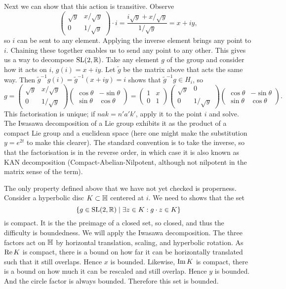 \begin{example}
Next we can show that this action is transitive.
Observe
\[
\begin{pmatrix}
\sqrt{y} & x/\sqrt{y} \\ 0 & 1/\sqrt{y}
\end{pmatrix} \cdot i
= \frac{i\sqrt{y} + x/\sqrt{y}}{1/\sqrt{y}}
= x + iy,
\]
so $i$ can be sent to any element.
Applying the inverse element brings any point to $i$.
Chaining these together enables us to send any point to any other.
This gives us a way to decompose $\mathrm{SL}(2,\mathbb{R})$.
Take any element $g$ of the group and consider how it acts on $i$, $g(i) = x + iy$.
Let $\tilde{g}$ be the matrix above that acts the same way.
Then $\tilde{g}^{-1}g (i) = \tilde{g}^{-1}(x+iy) = i$ shows that $\tilde{g}^{-1}g \in H_i$, so
\[
g 
= \begin{pmatrix}
\sqrt{y} & x/\sqrt{y} \\ 0 & 1/\sqrt{y}
\end{pmatrix}\begin{pmatrix}
\cos\theta & -\sin\theta \\ \sin\theta & \cos\theta
\end{pmatrix}
= \begin{pmatrix}
1 & x \\ 0 & 1
\end{pmatrix}\begin{pmatrix}
\sqrt{y} & 0 \\ 0 & 1/\sqrt{y}
\end{pmatrix}\begin{pmatrix}
\cos\theta & -\sin\theta \\ \sin\theta & \cos\theta
\end{pmatrix}.
\]
This factorisation is unique; if $nak = n'a'k'$, apply it to the point $i$ and solve.
The Iwasawa decomposition of a Lie group exhibits it as the product of a compact Lie group and a euclidean space (here one might make the substitution $y = e^{2t}$ to make this clearer).
The standard convention is to take the inverse, so that the factorisation is in the reverse order, in which case it is also known as KAN decomposition (Compact-Abelian-Nilpotent, although not nilpotent in the matrix sense of the term).

The only property defined above that we have not yet checked is properness.
Consider a hyperbolic disc $K \subset \mathbb{H}$ centered at $i$. 
We need to shows that the set 
\[
\{ g \in \mathrm{SL}(2,\mathbb{R}) \mid \exists z \in K : g \cdot z \in K\}
\]
is compact.
It is the the preimage of a closed set, so closed, and thus the difficulty is boundedness.
We will apply the Iwasawa decomposition.
The three factors act on $\mathbb{H}$ by horizontal translation, scaling, and hyperbolic rotation.
As $\operatorname{Re} K$ is compact, there is a bound on how far it can be horizontally translated such that it still overlaps.
Hence $x$ is bounded.
Likewise, $\operatorname{Im} K$ is compact, there is a bound on how much it can be rescaled and still overlap.
Hence $y$ is bounded.
And the circle factor is always bounded.
Therefore this set is bounded.
\end{example}


